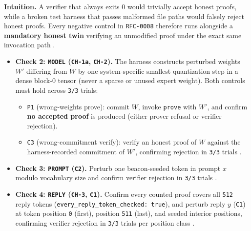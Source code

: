 \documentclass[11pt,letterpaper]{article}
\begin{document}
\textbf{Intuition.} A verifier that always exits 0 would trivially accept honest proofs, while a broken test harness that passes malformed file paths would falsely reject honest proofs. Every negative control in \texttt{RFC-0008} therefore runs alongside a \textbf{mandatory honest twin} verifying an unmodified proof under the exact same invocation path \cite{iproofs2026}.

\begin{itemize}
\item \textbf{Check 2: \texttt{MODEL} (\texttt{CH-1a}, \texttt{CH-2}).} The harness constructs perturbed weights $W'$ differing from $W$ by one system-specific smallest quantization step in a dense block-0 tensor (never a sparse or unused expert weight). Both controls must hold across \texttt{3/\allowbreak{}3} trials:
\begin{itemize}
\item \texttt{P1} (wrong-weights prove): commit $W$, invoke \texttt{prove} with $W'$, and confirm \textbf{no accepted proof} is produced (either prover refusal or verifier rejection).
\item \texttt{C3} (wrong-commitment verify): verify an honest proof of $W$ against the harness-recorded commitment of $W'$, confirming rejection in \texttt{3/\allowbreak{}3} trials \cite{iproofs2026}.
\end{itemize}
\item \textbf{Check 3: \texttt{PROMPT} (\texttt{C2}).} Perturb one beacon-seeded token in prompt $x$ modulo vocabulary size and confirm verifier rejection in \texttt{3/\allowbreak{}3} trials \cite{iproofs2026}.
\item \textbf{Check 4: \texttt{REPLY} (\texttt{CH-3}, \texttt{C1}).} Confirm every counted proof covers all \texttt{512} reply tokens (\texttt{every\_\allowbreak{}reply\_\allowbreak{}token\_\allowbreak{}checked: true}), and perturb reply $y$ (\texttt{C1}) at token position \texttt{0} (first), position \texttt{511} (last), and seeded interior positions, confirming verifier rejection in \texttt{3/\allowbreak{}3} trials per position class \cite{iproofs2026}.

\end{itemize}
\end{document}
